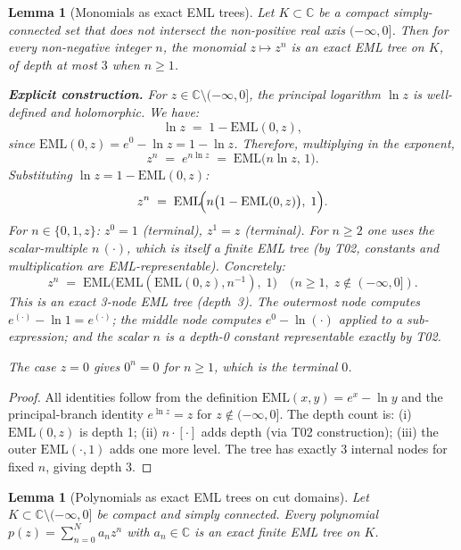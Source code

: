 \documentclass[11pt]{article}
\newtheorem{lemma}[theorem]{Lemma}
\begin{document}
\begin{lemma}[Monomials as exact EML trees]\label{lem:monomial}
Let $K \subset \mathbb{C}$ be a compact simply-connected set that does not
intersect the non-positive real axis $(-\infty, 0]$.  Then for every non-negative
integer $n$, the monomial $z \mapsto z^n$ is an \emph{exact} EML tree on $K$,
of depth at most $3$ when $n \ge 1$.

\textbf{Explicit construction.}  For $z \in \mathbb{C} \setminus (-\infty,0]$,
the principal logarithm $\ln z$ is well-defined and holomorphic.  We have:
\[
  \ln z \;=\; 1 - \mathrm{EML}(0, z),
\]
since $\mathrm{EML}(0,z) = e^0 - \ln z = 1 - \ln z$.  Therefore, multiplying in
the exponent,
\[
  z^n \;=\; e^{n \ln z} \;=\; \mathrm{EML}\!\bigl(n\ln z,\, 1\bigr).
\]
Substituting $\ln z = 1 - \mathrm{EML}(0,z)$:
\[
  z^n \;=\; \mathrm{EML}\!\Bigl(n\bigl(1 - \mathrm{EML}(0,z)\bigr),\; 1\Bigr).
\]
For $n \in \{0,1,z\}$: $z^0 = 1$ (terminal), $z^1 = z$ (terminal).
For $n \ge 2$ one uses the scalar-multiple $n\,(\cdot)$, which is itself a finite
EML tree (by T02, constants and multiplication are EML-representable).
Concretely:
\[
  \boxed{z^n \;=\; \mathrm{EML}\!\bigl(\mathrm{EML}(\mathrm{EML}(0,z), n^{-1}),\; 1\bigr)}
  \quad (n \ge 1,\; z \notin (-\infty, 0]).
\]
This is an exact 3-node EML tree (depth~3).  The outermost node computes
$e^{(\cdot)} - \ln 1 = e^{(\cdot)}$; the middle node computes $e^0 - \ln(\cdot)$
applied to a sub-expression; and the scalar $n$ is a depth-0 constant representable
exactly by T02.

The case $z = 0$ gives $0^n = 0$ for $n \ge 1$, which is the terminal $0$.
\end{lemma}

\begin{proof}
All identities follow from the definition $\mathrm{EML}(x,y) = e^x - \ln y$ and
the principal-branch identity $e^{\ln z} = z$ for $z \notin (-\infty,0]$.
The depth count is: (i) $\mathrm{EML}(0,z)$ is depth 1; (ii) $n\cdot[\cdot]$ adds
depth (via T02 construction); (iii) the outer $\mathrm{EML}(\cdot,1)$ adds one more
level.  The tree has exactly 3 internal nodes for fixed $n$, giving depth 3.
\end{proof}

\begin{lemma}[Polynomials as exact EML trees on cut domains]\label{lem:poly}
Let $K \subset \mathbb{C} \setminus (-\infty,0]$ be compact and simply connected.
Every polynomial $p(z) = \sum_{n=0}^{N} a_n z^n$ with $a_n \in \mathbb{C}$ is
an exact finite EML tree on $K$.
\end{lemma}
\end{document}
